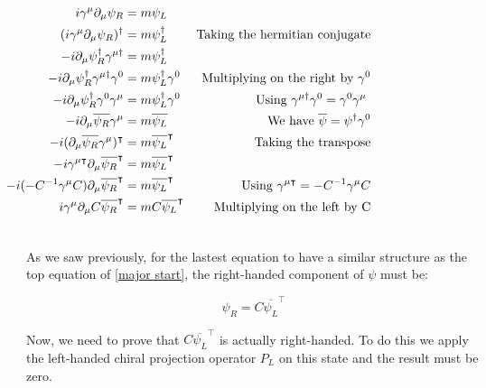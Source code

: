 \begin{align}
  &\begin{aligned}
     \mathllap{i \gamma^\mu \partial_\mu \psi_R} &= m\psi_L\\        
     \mathllap{(i \gamma^\mu \partial_\mu \psi_R)^\dagger} &= m\psi_L^\dagger  & \text{Taking the hermitian conjugate} \\
     \mathllap{-i \partial_\mu \psi_R^\dagger \gamma^{\mu \dagger}} &= m \psi_L^\dagger \\
     \mathllap{-i \partial_\mu \psi_R^\dagger \gamma^{\mu \dagger}\gamma^0} &= m \psi_L^\dagger \gamma^0  &\text{Multiplying on the right by $\gamma^0$}\\
     \mathllap{-i \partial_\mu \psi_R^\dagger \gamma^0 \gamma^\mu} &= m \psi_L^\dagger \gamma^0  &\text{Using $\gamma^{\mu \dagger}\gamma^0 = \gamma^0 \gamma^\mu$ }\\    %
     \mathllap{-i \partial_\mu \overline{\psi_R}\gamma^\mu} &= m \overline{\psi_L} &\text{We have $\overline{\psi} = \psi^{\dagger}\gamma^0$}\\
     \mathllap{-i (\partial_\mu \overline{\psi_R}\gamma^\mu)^\intercal} &= m \overline{\psi_L}^\intercal &\text{Taking the transpose}\\
     \mathllap{-i \gamma^{\mu \intercal} \partial_\mu \overline{\psi_R}^\intercal} &= m \overline{\psi_L}^\intercal \\
     \mathllap{-i (-C^{-1}\gamma^\mu C) \partial_\mu \overline{\psi_R}^\intercal} &= m \overline{\psi_L}^\intercal &\text{Using $\gamma^{\mu \intercal}= -C^{-1}\gamma^\mu C$}\\
     \mathllap{i \gamma^\mu \partial_\mu C \overline{\psi_R}^\intercal} &= m C \overline{\psi_L}^\intercal &\text{Multiplying on the left by C}\\
  &\end{aligned}
\end{align}

As we saw previously, for the lastest equation to have a similar structure as the top equation of \ref{major start}, the right-handed component of $\psi$ must be:

\begin{equation}
 \psi_R = C \overline{\psi_L}^\intercal
\end{equation}

Now, we need to prove that $C \overline{\psi_L}^\intercal$ is actually right-handed. To do this we apply the left-handed chiral projection operator $P_L$ on this state and
the result must be zero.

